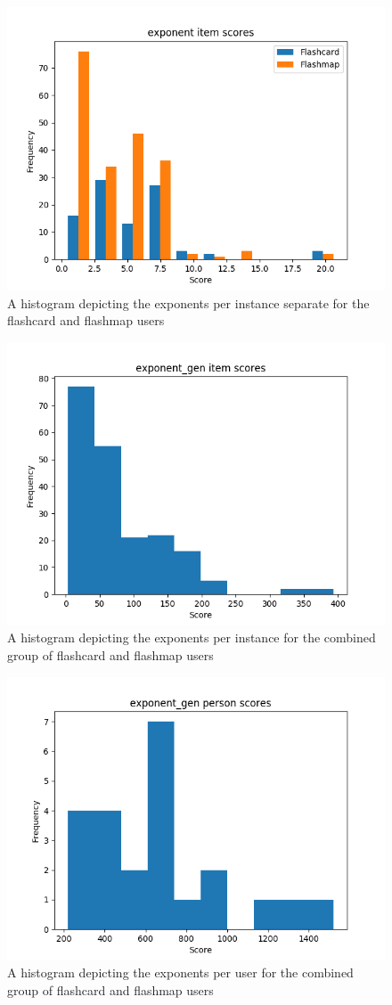 \begin{figure}
    \centering
    \includegraphics[width=.7\textwidth]{img/exponent_diff.png}
    \caption{A histogram depicting the exponents per instance separate for the flashcard and flashmap users}
    \label{fig:exponent_diff}
\end{figure}

\begin{figure}
    \centering
    \includegraphics[width=.7\textwidth]{img/exponent_gen_diff.png}
    \caption{A histogram depicting the exponents per instance for the combined group of flashcard and flashmap users}
    \label{fig:exponent_gen_diff}
\end{figure}
\begin{figure}
    \centering
    \includegraphics[width=.7\textwidth]{img/exponent_gen_abil.png}
    \caption{A histogram depicting the exponents per user for the combined group of flashcard and flashmap users}
    \label{fig:exponent_gen_abil}
\end{figure}

